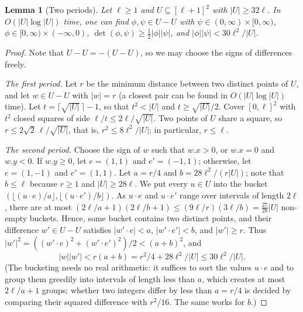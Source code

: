 \documentclass[11pt]{article}
\newtheorem{lemma}[theorem]{Lemma}
\theoremstyle{definition}
\renewcommand{\O}{O}
\newcommand{\abs}[1]{\lvert #1 \rvert}
\newcommand{\x}[1]{#1.x}
\newcommand{\y}[1]{#1.y}
\begin{document}
\begin{lemma}[Two periods]\label{lem:two_periods}
Let $\ell \ge 1$ and $U \subseteq [\ell+1]^2$ with $\abs{U} \ge 32\ell$.
In $\O(\abs{U}\log\abs{U})$ time, one can find $\phi, \psi \in U - U$ with $\psi \in (0, \infty) \times [0, \infty)$, $\phi \in [0, \infty) \times (-\infty, 0)$, $\det(\phi,\psi) \ge \frac12\abs{\phi}\abs{\psi}$, and $\abs{\phi}\abs{\psi} < 30\ell^2/\abs{U}$.
\end{lemma}
\begin{proof}
Note that $U - U = -(U-U)$, so we may choose the signs of differences freely.

\emph{The first period.}
Let $r$ be the minimum distance between two distinct points of $U$, and let $w \in U - U$ with $\abs{w} = r$ (a closest pair can be found in $\O(\abs{U}\log\abs{U})$ time).
Let $t = \lceil \sqrt{\abs{U}}\, \rceil - 1$, so that $t^2 < \abs{U}$ and $t \ge \sqrt{\abs{U}}/2$.
Cover $[0,\ell]^2$ with $t^2$ closed squares of side $\ell/t \le 2\ell/\sqrt{\abs{U}}$.
Two points of $U$ share a square, so $r \le 2\sqrt2\,\ell/\sqrt{\abs{U}}$, that is, $r^2 \le 8\ell^2/\abs{U}$; in particular, $r \le \ell$.

\emph{The second period.}
Choose the sign of $w$ such that $\x w > 0$, or $\x w = 0$ and $\y w < 0$.
If $\y w \ge 0$, let $e = (1,1)$ and $e' = (-1,1)$; otherwise, let $e = (1,-1)$ and $e' = (1,1)$.
Let $a = r/4$ and $b = 28\ell^2/(r\abs{U})$; note that $b \le \ell$ because $r \ge 1$ and $\abs{U} \ge 28\ell$.
We put every $u \in U$ into the bucket $(\lfloor (u \cdot e)/a \rfloor, \lfloor (u \cdot e')/b\rfloor)$.
As $u \cdot e$ and $u \cdot e'$ range over intervals of length $2\ell$, there are at most $(2\ell/a + 1)(2\ell/b+1) \le (9\ell/r)(3\ell/b) = \frac{27}{28}\abs{U}$ non-empty buckets.
Hence, some bucket contains two distinct points, and their difference $w' \in U - U$ satisfies $\abs{w' \cdot e} < a$, $\abs{w'\cdot e'} < b$, and $\abs{w'} \ge r$.
Thus $\abs{w'}^2 = ((w' \cdot e)^2 + (w'\cdot e')^2)/2 < (a+b)^2$, and
\[\abs{w}\abs{w'} < r(a + b) = r^2/4 + 28\ell^2/\abs{U} \le 30\ell^2/\abs{U}.\]
(The bucketing needs no real arithmetic: it suffices to sort the values $u \cdot e$ and to group them greedily into intervals of length less than $a$, which creates at most $2\ell/a + 1$ groups; whether two integers differ by less than $a = r/4$ is decided by comparing their squared difference with $r^2/16$. The same works for $b$.)


\end{proof}
\end{document}
